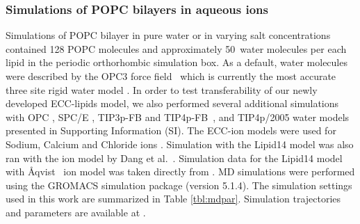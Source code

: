 \documentclass[aip,jcp,twocolumn]{revtex4}
\begin{document}
\subsubsection{Simulations of POPC bilayers in aqueous ions}
Simulations of POPC bilayer in pure water or in varying salt concentrations
contained 128 POPC molecules and approximately 50~water molecules per each lipid
in the periodic orthorhombic simulation box.
As a default, water molecules were described by the OPC3 force field~\cite{Izadi16} 
which is currently the most accurate three site rigid water model
. 
In order to test transferability of our newly developed ECC-lipids model, 
we also performed several additional simulations with 
OPC \cite{Izadi14}, SPC/E \cite{Berendsen1987}, TIP3p-FB and TIP4p-FB~\cite{Wang2014}, and TIP4p/2005 \cite{Abascal2005} water models
 presented in Supporting Information (SI). 
The ECC-ion models were used for Sodium, Calcium and Chloride ions \cite{jungwirth17-new-paper-to-be-published, kohagen16, Pluharova2014}.  %
Simulation with the Lipid14 model was also ran with the ion model by Dang et al.~\cite{smith94,chang1999,dang2006}.
Simulation data for the Lipid14 model with \AA{}qvist~\cite{aqvist90} ion model
was taken directly from \cite{lipid14POPC0mMNaClfiles}. 
MD simulations were performed using the GROMACS \cite{Abraham15} simulation package (version 5.1.4).  
The simulation settings used in this work are 
summarized in Table \ref{tbl:mdpar}. 
Simulation trajectories and parameters are available at \cite{??} . 
\end{document}
